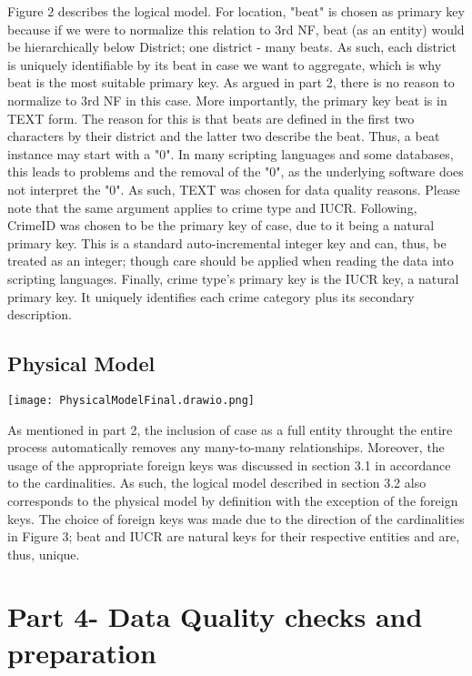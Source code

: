 \documentclass[a4paper]{article}
\begin{document}
Figure 2 describes the logical model. For location, "beat" is chosen as primary key because if we were to normalize this relation to 3rd NF, beat (as an entity) would be hierarchically below District; one district - many beats. As such, each district is uniquely identifiable by its beat in case we want to aggregate, which is why beat is the most suitable primary key. As argued in part 2, there is no reason to normalize to 3rd NF in this case. More importantly, the primary key beat is in TEXT form. The reason for this is that beats are defined in the first two characters by their district and the latter two describe the beat. Thus, a beat instance may start with a "0". In many scripting languages and some databases, this leads to problems and the removal of the "0", as the underlying software does not interpret the "0". As such, TEXT was chosen for data quality reasons. Please note that the same argument applies to crime type and IUCR. 
\indent Following, CrimeID was chosen to be the primary key of case, due to it being a natural primary key. This is a standard auto-incremental integer key and can, thus, be treated as an integer; though care should be applied when reading the data into scripting languages.
\indent Finally, crime type's primary key is the IUCR key, a natural primary key. It uniquely identifies each crime category plus its secondary description. 

\subsection{Physical Model}
\texttt{[image: PhysicalModelFinal.drawio.png]}

As mentioned in part 2, the inclusion of case as a full entity throught the entire process automatically removes any many-to-many relationships. Moreover, the usage of the appropriate foreign keys was discussed in section 3.1 in accordance to the cardinalities. As such, the logical model described in section 3.2 also corresponds to the physical model by definition with the exception of the foreign keys. The choice of foreign keys was made due to the direction of the cardinalities in Figure 3; beat and IUCR are natural keys for their respective entities and are, thus, unique.



\section{Part 4- Data Quality checks and preparation}
\end{document}
